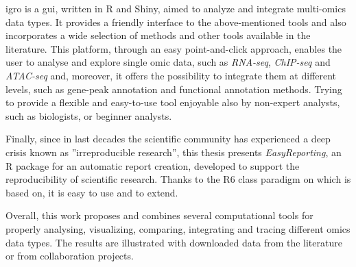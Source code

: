 \gls{igro} is a \gls{gui}, written in R and Shiny, aimed to analyze and integrate multi-omics data types. 
It provides a friendly interface to the above-mentioned tools and also incorporates a wide selection of methods and other tools available in the literature. This platform, through an easy point-and-click approach, enables the user to analyse and explore single omic data, such as \textit{RNA-seq}, \textit{ChIP-seq} and \textit{ATAC-seq} and, moreover, it offers the possibility to integrate them at different levels, such as gene-peak annotation and functional annotation methods.
Trying to provide a flexible and easy-to-use tool enjoyable also by non-expert analysts, such as biologists, or beginner analysts.

Finally, since in last decades the scientific community has experienced a deep crisis known as ''irreproducible research'', this thesis presents \textit{EasyReporting}, an R package for an automatic report creation, developed to support the reproducibility of scientific research.  
Thanks to the R6 class paradigm on which is based on, it is easy to use and to extend.

Overall, this work proposes and combines several computational tools for properly analysing, visualizing, comparing, integrating and tracing different omics data types.
The results are illustrated with downloaded data from the literature or from collaboration projects.